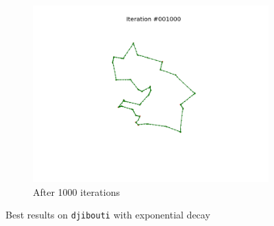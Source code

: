 \documentclass[11pt]{article}
\begin{document}
\begin{figure}
\begin{subfigure}{.33\textwidth}
  \includegraphics[trim={6cm 2cm 6cm 2cm}, clip=true,width=\linewidth]{d_1000.png}
  \caption{After 1000 iterations}
\end{subfigure}
\caption{Best results on \texttt{djibouti} with exponential decay}
\label{fig:bdjibouti}
\end{figure}
\end{document}
